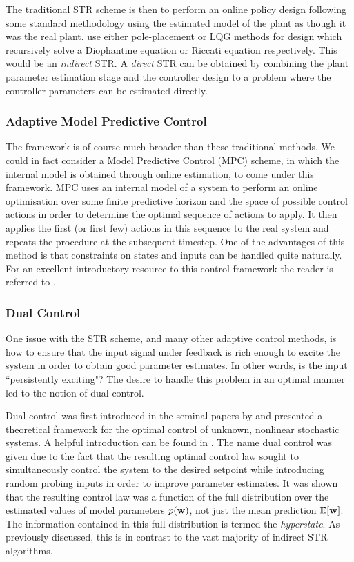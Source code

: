 The traditional STR scheme is then to perform an online policy design following some standard methodology using the estimated model of the plant as though it was the real plant. \cite{AsWi94} use either pole-placement or LQG methods for design which recursively solve a Diophantine equation or Riccati equation respectively. This would be an \textit{indirect} STR. A \textit{direct} STR can be obtained by combining the plant parameter estimation stage and the controller design to a problem where the controller parameters can be estimated directly.


\subsubsection{Adaptive Model Predictive Control}
The framework is of course much broader than these traditional methods. We could in fact consider a Model Predictive Control (MPC) scheme, in which the internal model is obtained through online estimation, to come under this framework. MPC uses an internal model of a system to perform an online optimisation over some finite predictive horizon and the space of possible control actions in order to determine the optimal sequence of actions to apply. It then applies the first (or first few) actions in this sequence to the real system and repeats the procedure at the subsequent timestep. One of the advantages of this method is that constraints on states and inputs can be handled quite naturally. For an excellent introductory resource to this control framework the reader is referred to \cite{Mac02}. 






\subsubsection{Dual Control} \label{sec:DC}
One issue with the STR scheme, and many other adaptive control methods, is how to ensure that the input signal under feedback is rich enough to excite the system in order to obtain good parameter estimates. In other words, is the input ``persistently exciting"? The desire to handle this problem in an optimal manner led to the notion of dual control.

Dual control was first introduced in the seminal papers by \cite{Fel61} and presented a theoretical framework for the optimal control of unknown, nonlinear stochastic systems. A helpful introduction can be found in \cite{Wit00}. The name dual control was given due to the fact that the resulting optimal control law sought to simultaneously control the system to the desired setpoint while introducing random probing inputs in order to improve parameter estimates. It was shown that the resulting control law was a function of the full distribution over the estimated values of model parameters $p(\mathbf{w})$, not just the mean prediction $\mathbb{E}[\mathbf{w}]$. The information contained in this full distribution is termed the \textit{hyperstate}. As previously discussed, this is in contrast to the vast majority of indirect STR algorithms.


